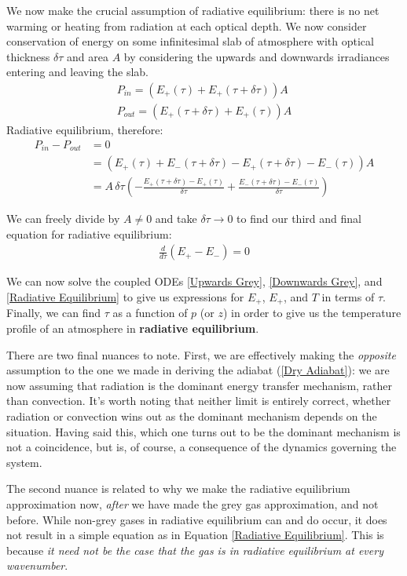 We now make the crucial assumption of radiative equilibrium: there is no net warming or heating from radiation at each optical depth. We now consider conservation of energy on some infinitesimal slab of atmosphere with optical thickness $\delta \tau$ and area $A$ by considering the upwards and downwards irradiances entering and leaving the slab. 
\begin{align*}
    P_{in}=(E_+(\tau)+E_+(\tau+\delta\tau))A\\
    P_{out}=(E_+(\tau+\delta\tau)+E_+(\tau))A
\end{align*}
Radiative equilibrium, therefore:
\begin{align*}
    P_{in}-P_{out}&=0\\
    &= (E_+(\tau)+E_-(\tau+\delta\tau)-E_+(\tau+\delta\tau)-E_-(\tau))A\\
    &=A\,\delta\tau
    \left(-
    \frac{E_+(\tau+\delta\tau)-E_+(\tau)}{\delta \tau}
    +
    \frac{E_-(\tau+\delta\tau)-E_-(\tau)}{\delta \tau}
    \right)
\end{align*}

We can freely divide by $A\neq0$ and take $\delta\tau\to0$ to find our third and final equation for radiative equilibrium:
\begin{align}\label{Radiative Equilibrium}
    \frac{d}{d\tau}(E_+-E_-)=0
\end{align}

We can now solve the coupled ODEs \ref{Upwards Grey}, \ref{Downwards Grey}, and \ref{Radiative Equilibrium} to give us expressions for $E_+$, $E_+$, and $T$ in terms of $\tau$. Finally, we can find $\tau$ as a function of $p$ (or $z$) in order to give us the temperature profile of an atmosphere in \textbf{radiative equilibrium}. 

There are two final nuances to note. First, we are effectively making the \textit{opposite} assumption to the one we made in deriving the adiabat (\ref{Dry Adiabat}): we are now assuming that radiation is the dominant energy transfer mechanism, rather than convection. It's worth noting that neither limit is entirely correct, whether radiation or convection wins out as the dominant mechanism depends on the situation. Having said this, which one turns out to be the dominant mechanism is not a coincidence, but is, of course, a consequence of the dynamics governing the system.

The second nuance is related to why we make the radiative equilibrium approximation now, \textit{after} we have made the grey gas approximation, and not before. While non-grey gases in radiative equilibrium can and do occur, it does not result in a simple equation as in Equation \ref{Radiative Equilibrium}. This is because \textit{it need not be the case that the gas is in radiative equilibrium at every wavenumber}. 

